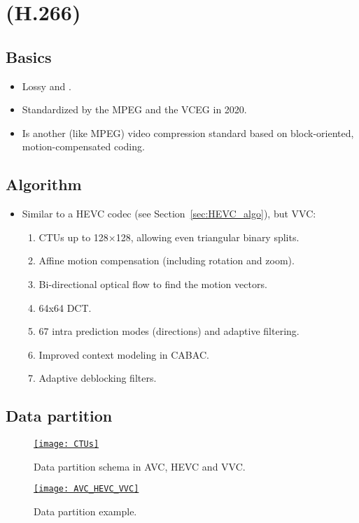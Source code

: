 \chapter{ (H.266)}

\section{Basics}
\begin{itemize}
\item Lossy and  \cite{wikipedia_VVC}.
\item Standardized by the \gls{MPEG} and the \gls{VCEG} in 2020.
\item Is another (like \gls{MPEG}) video compression standard based on
  block-oriented, motion-compensated coding.
\end{itemize}

\section{Algorithm}
\begin{itemize}
\item Similar to a \gls{HEVC} codec (see Section~\ref{sec:HEVC_algo}),
  but \gls{VVC}:
\begin{enumerate}
\item \glspl{CTU} up to 128×128, allowing even triangular binary splits.
\item Affine motion compensation (including rotation and zoom).
\item Bi-directional optical flow to find the motion vectors.
\item 64x64 \gls{DCT}.
\item 67 intra prediction modes (directions) and adaptive filtering.
\item Improved context modeling in \gls{CABAC}.
\item Adaptive deblocking filters.
\end{enumerate}
\end{itemize}

\section{Data partition}

\begin{figure}[H]
  \centering
  \href{https://thebroadcastknowledge.com/2020/11/25/video-the-new-video-codec-landscape-vvc-evc-hevc-lc-evc-av1-and-more/}{\texttt{[image: CTUs]}}
  \caption{Data partition schema in \gls{AVC}, \gls{HEVC} and \gls{VVC}.}
  \label{fig:VVC_partition_1}
\end{figure}

\begin{figure}[H]
  \centering
  \href{https://www.linkedin.com/pulse/video-coding-standards-comparison-sraas}{\texttt{[image: AVC\_HEVC\_VVC]}}
  \caption{Data partition example.}
  \label{fig:VVC_partition_1}
\end{figure}

